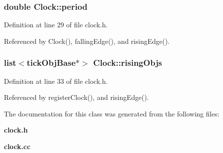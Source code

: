 \subsubsection[{period}]{\setlength{\rightskip}{0pt plus 5cm}double {\bf Clock::period}}\label{classClock_1bff60a169a5db12917207d37358f446}




Definition at line 29 of file clock.h.

Referenced by Clock(), fallingEdge(), and risingEdge().
\subsubsection[{risingObjs}]{\setlength{\rightskip}{0pt plus 5cm}list$<${\bf tickObjBase}$\ast$$>$ {\bf Clock::risingObjs}}\label{classClock_ed711a85f243ca3f49a403750a5445b9}




Definition at line 33 of file clock.h.

Referenced by registerClock(), and risingEdge().

The documentation for this class was generated from the following files:\begin{CompactItemize}
\item 
{\bf clock.h}\item 
{\bf clock.cc}\end{CompactItemize}
